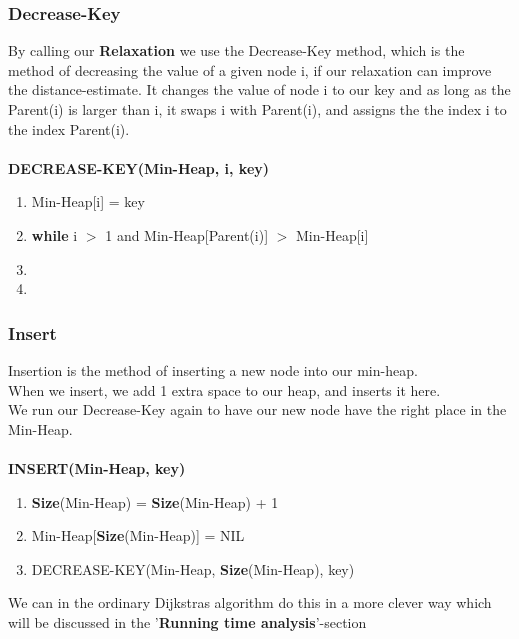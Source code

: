 \documentclass[11pt]{article}
\begin{document}
\subsubsection{Decrease-Key}
By calling our \textbf{Relaxation} we use the Decrease-Key method, which is the method of decreasing the value of a given node i, if our relaxation can improve the distance-estimate. It changes the value of node i to our key and as long as the Parent(i) is larger than i, it swaps i with Parent(i), and assigns the the index i to the index Parent(i).\\\\
\textbf{DECREASE-KEY(Min-Heap, i, key)}
\begin{enumerate}
\setlength\itemsep{0em}
\item Min-Heap[i] = key
\item \textbf{while } i $>$ 1 and Min-Heap[Parent(i)] $>$ Min-Heap[i]
\item {}
\item {}
\end{enumerate}
\subsubsection{Insert}
Insertion is the method of inserting a new node into our min-heap.\\
When we insert, we add 1 extra space to our heap, and inserts it here.\\
We run our Decrease-Key again to have our new node have the right place in the Min-Heap.\\\\
\textbf{INSERT(Min-Heap, key)}
\begin{enumerate}
\setlength\itemsep{0em}
\item \textbf{Size}(Min-Heap) = \textbf{Size}(Min-Heap) + 1
\item Min-Heap[\textbf{Size}(Min-Heap)] = NIL
\item DECREASE-KEY(Min-Heap, \textbf{Size}(Min-Heap), key)
\end{enumerate}
We can in the ordinary Dijkstras algorithm do this in a more clever way which will be discussed in the '\textbf{Running time analysis}'-section
\end{document}
